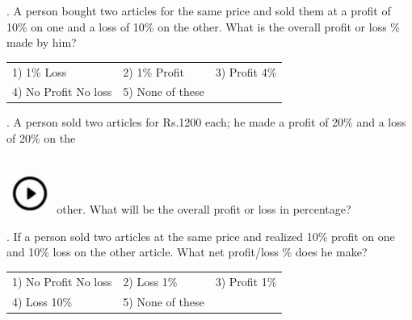 \documentclass{article}
\begin{document}
	\noindent 
	
	\noindent 
	
	\noindent 
	
	\noindent 
	
	\noindent 
	
	\noindent 
	
	. A person bought two articles for the same price and sold them at a profit of 10\% on one and a loss of 10\% on the other. What is the overall profit or loss \% made by him?
	
	\noindent 
	
	
		 
	\begin{tabular}{p{1.7in} p{1.6in} p{1.6in}} \\ 
 1) 1\% Loss & 2) 1\% Profit & 3) Profit 4\% 
		\\
4) No Profit No loss & 5) None of these  \\
\end{tabular} 

	
	
	
	\noindent 
	
	\noindent 
	
	. A person sold two articles for Rs.1200 each; he made a profit of 20\% and a loss of 20\% on the
	
	\noindent \noindent \\ \includegraphics*[width=0.60in, height=0.52in]{images/image1} other. What will be the overall profit or loss in percentage?
	
	\noindent 
	
	\noindent 
	
	\noindent 
	
	\noindent 
	
	\noindent 
	
	\noindent 
	
	. If a person sold two articles at the same price and realized 10\% profit on one and 10\% loss on the other article. What net profit/loss \% does he make?
	
	\noindent 
	

		 
	\begin{tabular}{p{1.7in} p{1.6in} p{1.6in}} \\ 
 1) No Profit No loss  & 2) Loss 1\% & 3) Profit 1\% \\  
		
4) Loss 10\%  & 5) None of these  \\
\end{tabular}   \\  
	
\end{document}
